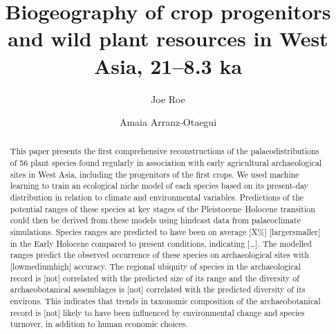 \documentclass[
  number,
  review]{elsarticle}
\begin{document}
\begin{frontmatter}
\title{Biogeography of crop progenitors and wild plant resources in West
Asia, 21--8.3 ka}
\author[1,2]{Joe Roe%
%
}
\author[3]{Amaia Arranz-Otaegui%
%
}





        
\begin{abstract}
This paper presents the first comprehensive reconstructions of the
palaeodistributions of 56 plant species found regularly in association
with early agricultural archaeological sites in West Asia, including the
progenitors of the first crops. We used machine learning to train an
ecological niche model of each species based on its present-day
distribution in relation to climate and environmental variables.
Predictions of the potential ranges of these species at key stages of
the Pleistocene--Holocene transition could then be derived from these
models using hindcast data from palaeoclimate simulations. Species
ranges are predicted to have been on average {[}X\%{]}
{[}larger\textbar smaller{]} in the Early Holocene compared to present
conditions, indicating {[}\ldots{]}. The modelled ranges predict the
observed occurrence of these species on archaeological sites with
{[}low\textbar medium\textbar high{]} accuracy. The regional ubiquity of
species in the archaeological record is {[}not{]} correlated with the
predicted size of its range and the diversity of archaeobotanical
assemblages is {[}not{]} correlated with the predicted diversity of its
environs. This indicates that trends in taxonomic composition of the
archaeobotanical record is {[}not{]} likely to have been influenced by
environmental change and species turnover, in addition to human economic
choices.
\end{abstract}





\end{frontmatter}
    
\end{document}

